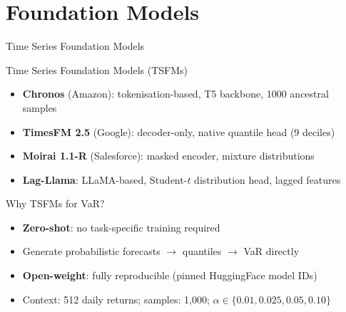 \documentclass[9pt, aspectratio=169, t]{beamer}
\begin{document}
\section{Foundation Models}
\begin{frame}{Time Series Foundation Models}
	\vspace{-0.2cm}
	{\small
	\begin{block}{Time Series Foundation Models (TSFMs)}
		\begin{itemize}\setlength{\itemsep}{1pt}
			\item \textbf{Chronos} (Amazon): tokenisation-based, T5 backbone, 1000 ancestral samples
			\item \textbf{TimesFM 2.5} (Google): decoder-only, native quantile head (9 deciles)
			\item \textbf{Moirai 1.1-R} (Salesforce): masked encoder, mixture distributions
			\item \textbf{Lag-Llama}: LLaMA-based, Student-$t$ distribution head, lagged features
		\end{itemize}
	\end{block}
	\vspace{1mm}
	\begin{exampleblock}{Why TSFMs for VaR?}
		\begin{itemize}\setlength{\itemsep}{2pt}
			\item \textbf{Zero-shot}: no task-specific training required
			\item Generate probabilistic forecasts $\to$ quantiles $\to$ VaR directly
			\item \textbf{Open-weight}: fully reproducible (pinned HuggingFace model IDs)
			\item Context: 512 daily returns; samples: 1{,}000; $\alpha \in \{0.01, 0.025, 0.05, 0.10\}$
		\end{itemize}
	\end{exampleblock}
	}
\end{frame}
\end{document}

